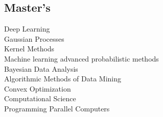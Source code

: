 \documentclass[]{deedy-resume}
\begin{document}
\begin{minipage}[t]{0.35\textwidth}
\subsection{Master's}
\textbullet{} Deep Learning\\
\textbullet{} Gaussian Processes\\
\textbullet{} Kernel Methods\\
\textbullet{} Machine learning advanced probabilistic methods\\
\textbullet{} Bayesian Data Analysis\\
\textbullet{} Algorithmic Methods of Data Mining\\
\textbullet{} Convex Optimization \\
\textbullet{} Computational Science \\
\textbullet{} Programming Parallel Computers \\
\sectionsep





\end{minipage}
\end{document}
